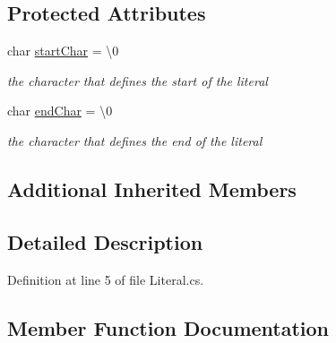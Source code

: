 \subsection*{Protected Attributes}
\begin{DoxyCompactItemize}
\item 
char \hyperlink{class_c_p_u___o_s___simulator_1_1_compiler_1_1_frontend_1_1_tokens_1_1_literal_ae93e9ee8a14f8f8fed07f5e9a8232b5a}{start\+Char} = \textquotesingle{}\textbackslash{}0\textquotesingle{}
\begin{DoxyCompactList}\small\item\em the character that defines the start of the literal \end{DoxyCompactList}\item 
char \hyperlink{class_c_p_u___o_s___simulator_1_1_compiler_1_1_frontend_1_1_tokens_1_1_literal_ab07076b3a3eaae7e88f664904aaa341f}{end\+Char} = \textquotesingle{}\textbackslash{}0\textquotesingle{}
\begin{DoxyCompactList}\small\item\em the character that defines the end of the literal \end{DoxyCompactList}\end{DoxyCompactItemize}
\subsection*{Additional Inherited Members}


\subsection{Detailed Description}


Definition at line 5 of file Literal.\+cs.



\subsection{Member Function Documentation}
\hypertarget{class_c_p_u___o_s___simulator_1_1_compiler_1_1_frontend_1_1_tokens_1_1_literal_af449c5fee28fb2076933cdfc67857c23}{}

